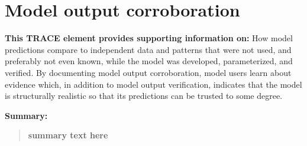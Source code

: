 \documentclass{article}[12pt]
\begin{document}
%
%


\section{Model output corroboration}

\textbf{This TRACE element provides supporting information on:}  How model predictions compare to independent data and patterns that were not used, and preferably not even known, while the model was developed, parameterized, and verified. By documenting model output corroboration, model users learn about evidence which, in addition to model output verification, indicates that the model is structurally realistic so that its predictions can be trusted to some degree. 

\textbf{Summary:}
\begin{verse}
\textbf{
summary text here
}
\end{verse}
\end{document}
